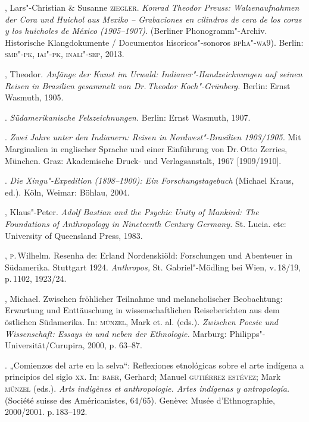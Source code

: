 \begin{bibliohedra}
 , Lars"-Christian \& Susanne \textsc{ziegler}. \textit{Konrad Theodor Preuss:
 Walzenaufnahmen der Cora und Huichol aus Mexiko -- Grabaciones en
 cilindros de cera de los coras y los huicholes de México (1905--1907).}
 (Berliner Phonogramm"-Archiv. Historische Klangdokumente / Documentos
 hisoricos"-sonoros \textsc{bp}h\textsc{a}"-\textsc{wa}9). Berlin: \textsc{smb"-pk, iai"-pk, inali"-sep}, 2013.

 , Theodor. \textit{Anfänge der Kunst im Urwald:
 Indianer"-Handzeichnungen auf seinen Reisen in Brasilien gesammelt von
 Dr.\,Theodor Koch"-Grünberg.} Berlin: Ernst Wasmuth, 1905.

 \titidem. \textit{Südamerikanische Felszeichnungen.} Berlin:
 Ernst Wasmuth, 1907.

 \titidem. \textit{Zwei Jahre unter den Indianern: Reisen in
 Nordwest"-Brasilien 1903/1905.} Mit Marginalien in englischer Sprache
 und einer Einführung von Dr.\,Otto Zerries, München. Graz: Akademische
 Druck- und Verlagsanstalt, 1967 {[}1909/1910{]}.

 \titidem. \textit{Die Xingu"-Expedition (1898--1900): Ein
 Forschungstagebuch} (Michael Kraus, ed.). Köln, Weimar: Böhlau, 2004.

 , Klaus"-Peter. \textit{Adolf Bastian and the Psychic Unity of
 Mankind: The Foundations of Anthropology in Nineteenth Century Germany.}
 St. Lucia. etc: University of Queensland Press, 1983.

 , \textsc{p}.\,Wilhelm. Resenha de: Erland Nordenskiöld: Forschungen und
 Abenteuer in Südamerika. Stuttgart 1924. \textit{Anthropos,} St.
 Gabriel"-Mödling bei Wien, v.\,18/19, p.\,1102, 1923/24.

 , Michael. Zwischen fröhlicher Teilnahme und melancholischer
 Beobachtung: Erwartung und Enttäuschung in wissenschaftlichen
 Reiseberichten aus dem östlichen Südamerika. In: \textsc{münzel}, Mark et. al.
 (eds.). \textit{Zwischen Poesie und Wissenschaft: Essays in und neben
 der Ethnologie.} Marburg: Philipps"-Universität/Curupira, 2000, p.
 63--87.

 \titidem. „Comienzos del arte en la selva``: Reflexiones
 etnológicas sobre el arte indígena a principios del siglo \textsc{xx}. In: \textsc{baer},
 Gerhard; Manuel \textsc{gutiérrez estévez}; Mark \textsc{münzel} (eds.). \textit{Arts
 indigènes et anthropologie. Artes indígenas y antropología.} (Société
 suisse des Américanistes, 64/65). Genève: Musée d'Ethnographie,
 2000/2001. p.\,183--192.


\end{bibliohedra}
